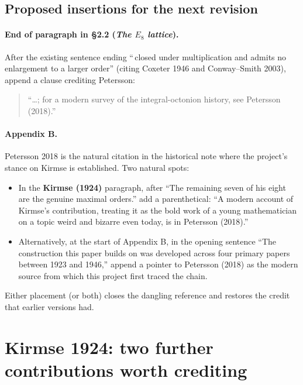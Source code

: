 \documentclass[11pt]{amsart}
\theoremstyle{remark}
\begin{document}
\subsection*{Proposed insertions for the next revision}

\paragraph{End of paragraph in \S2.2 (\emph{The $E_8$ lattice}).}
After the existing sentence ending ``\,closed under multiplication
and admits no enlargement to a larger order'' (citing Coxeter 1946
and Conway--Smith 2003), append a clause crediting Petersson:
\begin{quote}
``\ldots; for a modern survey of the integral-octonion history,
see Petersson (2018).''
\end{quote}

\paragraph{Appendix B.}
Petersson 2018 is the natural citation in the historical note where
the project's stance on Kirmse is established.  Two natural spots:
\begin{itemize}
\item In the \textbf{Kirmse (1924)} paragraph, after ``The remaining
  seven of his eight are the genuine maximal orders.'' add a
  parenthetical: ``A modern account of Kirmse's contribution,
  treating it as the bold work of a young mathematician on a topic
  weird and bizarre even today, is in Petersson (2018).''
\item Alternatively, at the start of Appendix B, in the opening
  sentence ``The construction this paper builds on was developed
  across four primary papers between 1923 and 1946,'' append a
  pointer to Petersson (2018) as the modern source from which this
  project first traced the chain.
\end{itemize}

Either placement (or both) closes the dangling reference and
restores the credit that earlier versions had.

\section{Kirmse 1924: two further contributions worth crediting}
\end{document}
